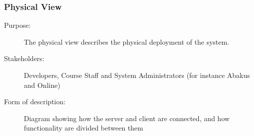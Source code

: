 \subsubsection{Physical View}
\begin{description}
  \item[Purpose:]{The physical view describes the physical deployment of the
    system.}
  \item[Stakeholders:]{Developers, Course Staff and System Administrators (for
    instance Abakus and Online)}
  \item[Form of description:]{Diagram showing how the server and client are
    connected, and how functionality are divided between them}
\end{description}
